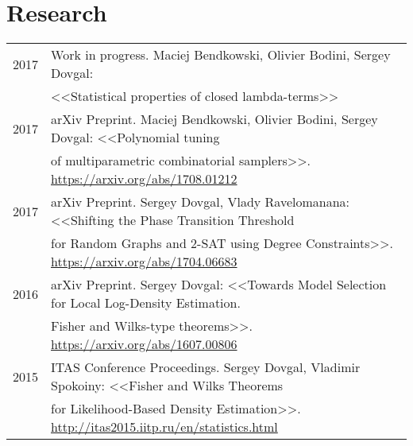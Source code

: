 \documentclass[a4paper,10pt]{article} %
\begin{document}
%
%
%
%

\vfill


\section{Research}
\begin{tabular}{rl}
2017 & Work in progress. Maciej Bendkowski, Olivier Bodini, Sergey
     Dovgal:\\&
<<Statistical properties of closed lambda-terms>>\\
2017 & arXiv Preprint. Maciej Bendkowski, Olivier Bodini, Sergey
    Dovgal: <<Polynomial tuning \\& 
of multiparametric combinatorial samplers>>.
\url{https://arxiv.org/abs/1708.01212}
\\
2017 & arXiv Preprint. Sergey Dovgal, Vlady Ravelomanana:
 <<Shifting the Phase Transition Threshold\\& for Random Graphs and 2-SAT using
Degree Constraints>>. \url{https://arxiv.org/abs/1704.06683} \\
2016 & arXiv Preprint. Sergey Dovgal:
 <<Towards Model Selection for Local Log-Density Estimation.\\& Fisher and Wilks-type theorems>>. \url{https://arxiv.org/abs/1607.00806} \\
2015 & ITAS Conference Proceedings. Sergey Dovgal, Vladimir Spokoiny: 
 <<Fisher and Wilks Theorems\\& for Likelihood-Based Density Estimation>>.
\url{http://itas2015.iitp.ru/en/statistics.html}

\end{tabular}
\end{document}
